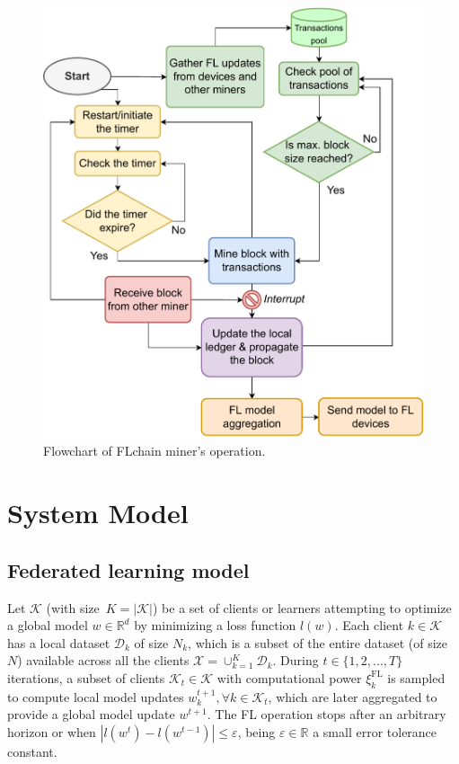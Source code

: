 \documentclass[lettersize,journal]{IEEEtran}
\begin{document}
\begin{figure}[ht!]
	\centering
	\includegraphics[width=.8\linewidth]{img/flowchart_flchain_miner.pdf}
	\caption{Flowchart of FLchain miner's operation.}
	\label{fig:flowchart_flchain_miner}
\end{figure}

\section{System Model}
\label{section:system_model}

\subsection{Federated learning model}
\label{section:fl_model}

Let $\mathcal{K}$ (with size~$K=|\mathcal{K}|$) be a set of clients or learners attempting to optimize a global model $w \in \mathbb{R}^d$ by minimizing a loss function $l(w)$. Each client $k\in \mathcal{K}$ has a local dataset $\mathcal{D}_k$ of size $N_k$, which is a subset of the entire dataset (of size $N$) available across all the clients $\mathcal{X} = \cup_{k=1}^K \mathcal{D}_k$. During $t\in \{1,2,...,T\}$ iterations, a subset of clients $\mathcal{K}_t \in \mathcal{K}$ with computational power $\xi_k^\text{FL}$ is sampled to compute local model updates $w_k^{t+1}, \forall k\in \mathcal{K}_t$, which are later aggregated to provide a global model update $w^{t+1}$. The FL operation stops after an arbitrary horizon or when $|l(w^t) - l(w^{t-1})| \leq \varepsilon$, being $\varepsilon \in \mathbb{R}$ a small error tolerance constant.
\end{document}
